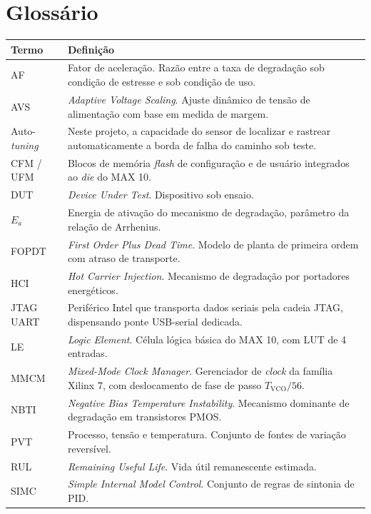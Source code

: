 \documentclass[11pt,a4paper]{article}
\begin{document}
\clearpage
\appendix
\section{Glossário}

\begin{longtable}{@{}L{3.0cm} L{12.1cm}@{}}
\toprule
\textbf{Termo} & \textbf{Definição} \\
\midrule
\endhead
AF & Fator de aceleração. Razão entre a taxa de degradação sob condição de estresse e sob condição de uso. \\
AVS & \emph{Adaptive Voltage Scaling}. Ajuste dinâmico de tensão de alimentação com base em medida de margem. \\
Auto-\emph{tuning} & Neste projeto, a capacidade do sensor de localizar e rastrear automaticamente a borda de falha do caminho sob teste. \\
CFM / UFM & Blocos de memória \emph{flash} de configuração e de usuário integrados ao \emph{die} do MAX 10. \\
DUT & \emph{Device Under Test}. Dispositivo sob ensaio. \\
$E_a$ & Energia de ativação do mecanismo de degradação, parâmetro da relação de Arrhenius. \\
FOPDT & \emph{First Order Plus Dead Time}. Modelo de planta de primeira ordem com atraso de transporte. \\
HCI & \emph{Hot Carrier Injection}. Mecanismo de degradação por portadores energéticos. \\
JTAG UART & Periférico Intel que transporta dados seriais pela cadeia JTAG, dispensando ponte USB-serial dedicada. \\
LE & \emph{Logic Element}. Célula lógica básica do MAX 10, com LUT de 4 entradas. \\
MMCM & \emph{Mixed-Mode Clock Manager}. Gerenciador de \emph{clock} da família Xilinx 7, com deslocamento de fase de passo $T_\text{VCO}/56$. \\
NBTI & \emph{Negative Bias Temperature Instability}. Mecanismo dominante de degradação em transistores PMOS. \\
PVT & Processo, tensão e temperatura. Conjunto de fontes de variação reversível. \\
RUL & \emph{Remaining Useful Life}. Vida útil remanescente estimada. \\
SIMC & \emph{Simple Internal Model Control}. Conjunto de regras de sintonia de PID. \\

\end{longtable}
\end{document}
